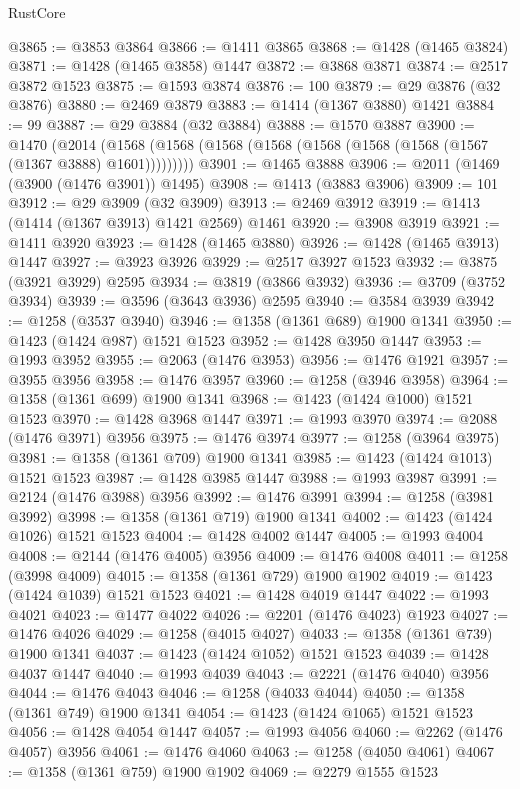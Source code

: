 \begin{lexlean}{RustCore}
\begin{coremodule}
@3865 := @3853 @3864
@3866 := @1411 @3865
@3868 := @1428 (@1465 @3824)
@3871 := @1428 (@1465 @3858) @1447
@3872 := @3868 @3871
@3874 := @2517 @3872 @1523
@3875 := @1593 @3874
@3876 := 100
@3879 := @29 @3876 (@32 @3876)
@3880 := @2469 @3879
@3883 := @1414 (@1367 @3880) @1421
@3884 := 99
@3887 := @29 @3884 (@32 @3884)
@3888 := @1570 @3887
@3900 := @1470
    (@2014 (@1568 (@1568 (@1568 (@1568 (@1568 (@1568 (@1568 (@1567 (@1367 @3888) @1601)))))))))
@3901 := @1465 @3888
@3906 := @2011 (@1469 (@3900 (@1476 @3901)) @1495)
@3908 := @1413 (@3883 @3906)
@3909 := 101
@3912 := @29 @3909 (@32 @3909)
@3913 := @2469 @3912
@3919 := @1413 (@1414 (@1367 @3913) @1421 @2569) @1461
@3920 := @3908 @3919
@3921 := @1411 @3920
@3923 := @1428 (@1465 @3880)
@3926 := @1428 (@1465 @3913) @1447
@3927 := @3923 @3926
@3929 := @2517 @3927 @1523
@3932 := @3875 (@3921 @3929) @2595
@3934 := @3819 (@3866 @3932)
@3936 := @3709 (@3752 @3934)
@3939 := @3596 (@3643 @3936) @2595
@3940 := @3584 @3939
@3942 := @1258 (@3537 @3940)
@3946 := @1358 (@1361 @689) @1900 @1341
@3950 := @1423 (@1424 @987) @1521 @1523
@3952 := @1428 @3950 @1447
@3953 := @1993 @3952
@3955 := @2063 (@1476 @3953)
@3956 := @1476 @1921
@3957 := @3955 @3956
@3958 := @1476 @3957
@3960 := @1258 (@3946 @3958)
@3964 := @1358 (@1361 @699) @1900 @1341
@3968 := @1423 (@1424 @1000) @1521 @1523
@3970 := @1428 @3968 @1447
@3971 := @1993 @3970
@3974 := @2088 (@1476 @3971) @3956
@3975 := @1476 @3974
@3977 := @1258 (@3964 @3975)
@3981 := @1358 (@1361 @709) @1900 @1341
@3985 := @1423 (@1424 @1013) @1521 @1523
@3987 := @1428 @3985 @1447
@3988 := @1993 @3987
@3991 := @2124 (@1476 @3988) @3956
@3992 := @1476 @3991
@3994 := @1258 (@3981 @3992)
@3998 := @1358 (@1361 @719) @1900 @1341
@4002 := @1423 (@1424 @1026) @1521 @1523
@4004 := @1428 @4002 @1447
@4005 := @1993 @4004
@4008 := @2144 (@1476 @4005) @3956
@4009 := @1476 @4008
@4011 := @1258 (@3998 @4009)
@4015 := @1358 (@1361 @729) @1900 @1902
@4019 := @1423 (@1424 @1039) @1521 @1523
@4021 := @1428 @4019 @1447
@4022 := @1993 @4021
@4023 := @1477 @4022
@4026 := @2201 (@1476 @4023) @1923
@4027 := @1476 @4026
@4029 := @1258 (@4015 @4027)
@4033 := @1358 (@1361 @739) @1900 @1341
@4037 := @1423 (@1424 @1052) @1521 @1523
@4039 := @1428 @4037 @1447
@4040 := @1993 @4039
@4043 := @2221 (@1476 @4040) @3956
@4044 := @1476 @4043
@4046 := @1258 (@4033 @4044)
@4050 := @1358 (@1361 @749) @1900 @1341
@4054 := @1423 (@1424 @1065) @1521 @1523
@4056 := @1428 @4054 @1447
@4057 := @1993 @4056
@4060 := @2262 (@1476 @4057) @3956
@4061 := @1476 @4060
@4063 := @1258 (@4050 @4061)
@4067 := @1358 (@1361 @759) @1900 @1902
@4069 := @2279 @1555 @1523

\end{coremodule}
\end{lexlean}
